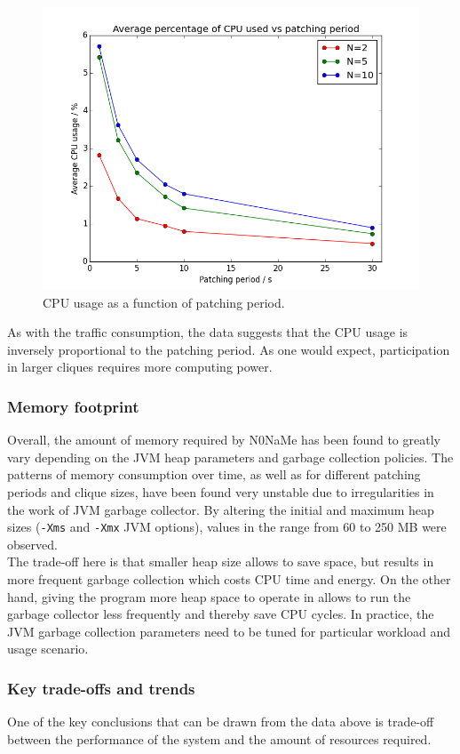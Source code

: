 \documentclass[a4paper, twoside, 12pt]{report}
\newcommand{\funkytt}{\fontfamily{AnonymousPro}\selectfont}
\begin{document}
\begin{figure}[H]
    \captionsetup{width=0.9\textwidth}
    \centering
    \includegraphics[width=0.60\linewidth]{pics/eval/cpu_vs_period.png}
    \caption{\label{fig:cpu_vs_period} CPU usage as a function of patching period.}
\end{figure}

As with the traffic consumption, the data suggests that the CPU usage is inversely proportional to the patching period. As one would expect, participation in larger cliques requires more computing power.

\subsubsection{Memory footprint}
Overall, the amount of memory required by {\funkytt N0NaMe} has been found to greatly vary depending on the JVM heap parameters and garbage collection policies. The patterns of memory consumption over time, as well as for different patching periods and clique sizes, have been found very unstable due to irregularities in the work of JVM garbage collector. By altering the initial and maximum heap sizes (\texttt{-Xms} and \texttt{-Xmx} JVM options), values in the range from 60 to 250 MB were observed. \\


The trade-off here is that smaller heap size allows to save space, but results in more frequent garbage collection which costs CPU time and energy. On the other hand, giving the program more heap space to operate in allows to run the garbage collector less frequently and thereby save CPU cycles. In practice, the JVM garbage collection parameters need to be tuned for particular workload and usage scenario.


\subsubsection{Key trade-offs and trends}
One of the key conclusions that can be drawn from the data above is trade-off between the performance of the system and the amount of resources required. \\
\end{document}
